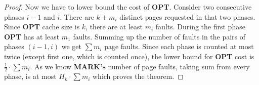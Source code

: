 \begin{proof}
Now we have to lower bound the cost of \textbf{OPT}. Consider two consecutive 
phases $i-1$ and $i$. There are $k + m_i$ distinct pages requested in that two 
phases. Since \textbf{OPT} cache size is $k$, there are at least $m_i$ faults. 
During the first phase \textbf{OPT} has at least $m_1$ faults. Summing up the 
number of faults in 
the pairs of phases $(i-1, i)$ we get $\sum m_i$ page faults. Since each phase 
is counted at most twice 
(except first one, which is counted once), the lower bound for 
\textbf{OPT} cost is $\frac{1}{2} \cdot \sum m_i$. As we know \textbf{MARK's} 
number of page faults, taking sum from every phase, is at most $H_k \cdot \sum 
m_i$ which proves the theorem. 
\end{proof}
